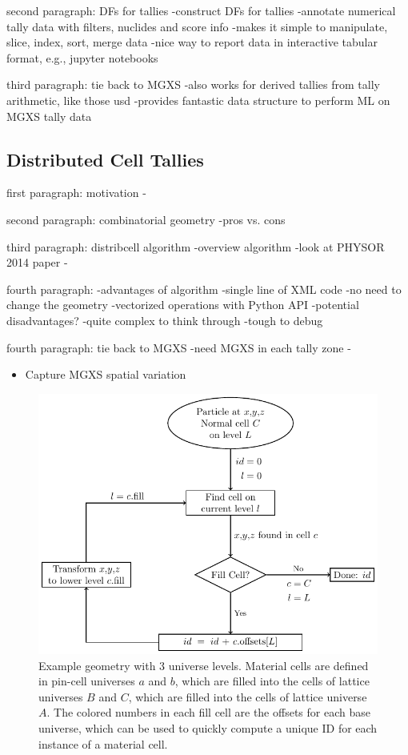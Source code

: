 second paragraph: DFs for tallies
-construct DFs for tallies 
-annotate numerical tally data with filters, nuclides and score info
-makes it simple to manipulate, slice, index, sort, merge data
-nice way to report data in interactive tabular format, e.g., jupyter notebooks

third paragraph: tie back to MGXS
-also works for derived tallies from tally arithmetic, like those usd 
-provides fantastic data structure to perform ML on MGXS tally data

\subsection{Distributed Cell Tallies}
\label{sec:chap3-distribcells}

first paragraph: motivation
-

second paragraph: combinatorial geometry
-pros vs. cons

third paragraph: distribcell algorithm
-overview algorithm
-look at PHYSOR 2014 paper
-

fourth paragraph:
-advantages of algorithm
  -single line of \ac{XML} code
  -no need to change the geometry
  -vectorized operations with Python API
-potential disadvantages?
  -quite complex to think through
  -tough to debug

fourth paragraph: tie back to MGXS
-need MGXS in each tally zone 
-

\begin{itemize}
  \item Capture \ac{MGXS} spatial variation~\cite{lax2014distribcell}
\end{itemize}

\begin{figure}
    \centering
    \includegraphics[width=6in]{figures/workflow/openmc/flow.pdf}
    \caption{\label{fig:indexing_scheme} Example geometry with 3 universe levels.  Material cells are defined in pin-cell universes $a$ and $b$, which are filled into the cells of lattice universes $B$ and $C$, which are filled into the cells of lattice universe $A$.  The colored numbers in each fill cell are the offsets for each base universe, which can be used to quickly compute a unique ID for each instance of a material cell.}
\end{figure}

